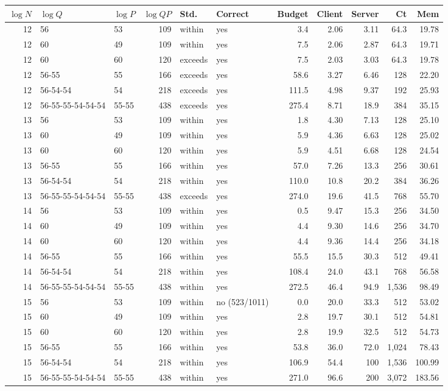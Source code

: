 \begin{tabular}{rllrllrrrrr}
\hline
$\log N$ & $\log Q$ & $\log P$ & $\log QP$ & Std. & Correct & Budget & Client & Server & Ct & Mem \\
\hline
12 & 56 & 53 & 109 & within & yes & 3.4 & 2.06 & 3.11 & 64.3 & 19.78 \\
12 & 60 & 49 & 109 & within & yes & 7.5 & 2.06 & 2.87 & 64.3 & 19.71 \\
12 & 60 & 60 & 120 & exceeds & yes & 7.5 & 2.03 & 3.03 & 64.3 & 19.78 \\
12 & 56-55 & 55 & 166 & exceeds & yes & 58.6 & 3.27 & 6.46 & 128 & 22.20 \\
12 & 56-54-54 & 54 & 218 & exceeds & yes & 111.5 & 4.98 & 9.37 & 192 & 25.93 \\
12 & 56-55-55-54-54-54 & 55-55 & 438 & exceeds & yes & 275.4 & 8.71 & 18.9 & 384 & 35.15 \\
13 & 56 & 53 & 109 & within & yes & 1.8 & 4.30 & 7.13 & 128 & 25.10 \\
13 & 60 & 49 & 109 & within & yes & 5.9 & 4.36 & 6.63 & 128 & 25.02 \\
13 & 60 & 60 & 120 & within & yes & 5.9 & 4.51 & 6.68 & 128 & 24.54 \\
13 & 56-55 & 55 & 166 & within & yes & 57.0 & 7.26 & 13.3 & 256 & 30.61 \\
13 & 56-54-54 & 54 & 218 & within & yes & 110.0 & 10.8 & 20.2 & 384 & 36.26 \\
13 & 56-55-55-54-54-54 & 55-55 & 438 & exceeds & yes & 274.0 & 19.6 & 41.5 & 768 & 55.70 \\
14 & 56 & 53 & 109 & within & yes & 0.5 & 9.47 & 15.3 & 256 & 34.50 \\
14 & 60 & 49 & 109 & within & yes & 4.4 & 9.30 & 14.6 & 256 & 34.70 \\
14 & 60 & 60 & 120 & within & yes & 4.4 & 9.36 & 14.4 & 256 & 34.18 \\
14 & 56-55 & 55 & 166 & within & yes & 55.5 & 15.5 & 30.3 & 512 & 49.41 \\
14 & 56-54-54 & 54 & 218 & within & yes & 108.4 & 24.0 & 43.1 & 768 & 56.58 \\
14 & 56-55-55-54-54-54 & 55-55 & 438 & within & yes & 272.5 & 46.4 & 94.9 & 1,536 & 98.49 \\
15 & 56 & 53 & 109 & within & no (523/1011) & 0.0 & 20.0 & 33.3 & 512 & 53.02 \\
15 & 60 & 49 & 109 & within & yes & 2.8 & 19.7 & 30.1 & 512 & 54.81 \\
15 & 60 & 60 & 120 & within & yes & 2.8 & 19.9 & 32.5 & 512 & 54.73 \\
15 & 56-55 & 55 & 166 & within & yes & 53.8 & 36.0 & 72.0 & 1,024 & 78.43 \\
15 & 56-54-54 & 54 & 218 & within & yes & 106.9 & 54.4 & 100 & 1,536 & 100.99 \\
15 & 56-55-55-54-54-54 & 55-55 & 438 & within & yes & 271.0 & 96.6 & 200 & 3,072 & 183.56 \\
\hline
\end{tabular}
